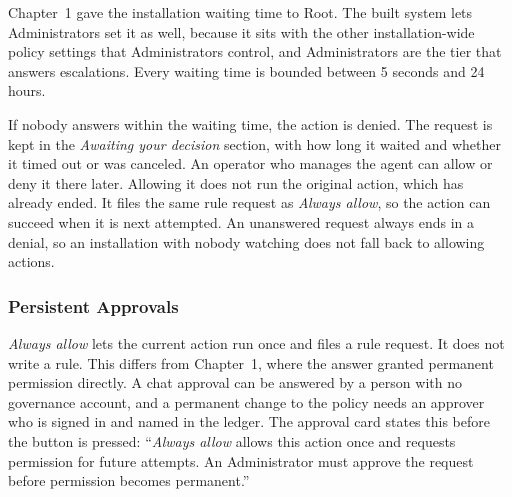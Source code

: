 Chapter~1 gave the installation waiting time to Root. The built system lets
Administrators set it as well, because it sits with the other
installation-wide policy settings that Administrators control, and
Administrators are the tier that answers escalations. Every waiting time is
bounded between 5 seconds and 24 hours.

If nobody answers within the waiting time, the action is denied. The
request is kept in the \textit{Awaiting your decision} section, with how
long it waited and whether it timed out or was canceled. An operator who
manages the agent can allow or deny it there later. Allowing it does not
run the original action, which has already ended. It files the same rule
request as \textit{Always allow}, so the action can succeed when it is next
attempted. An unanswered request always ends in a denial, so an
installation with nobody watching does not fall back to allowing actions.

\subsubsection{Persistent Approvals}
\label{sec:gov-persistent-approvals}

\textit{Always allow} lets the current action run once and files a rule
request. It does not write a rule. This differs from Chapter~1, where the
answer granted permanent permission directly. A chat approval can be
answered by a person with no governance account, and a permanent change to
the policy needs an approver who is signed in and named in the ledger. The
approval card states this before the button is pressed:
``\textit{Always allow} allows this action once and requests permission for
future attempts. An Administrator must approve the request before
permission becomes permanent.''

